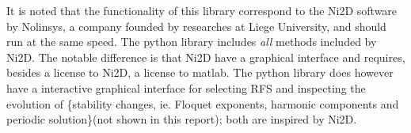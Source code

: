 It is noted that the functionality of this library correspond to the Ni2D
software by Nolinsys, a company founded by researches at Liege University, and
should run at the same speed. The python library includes \textit{all} methods
included by Ni2D. The notable difference is that Ni2D have a graphical interface
and requires, besides a license to Ni2D, a license to matlab. The python library
does however have a interactive graphical interface for selecting RFS and
inspecting the evolution of \{stability changes, ie. Floquet exponents, harmonic
components and periodic solution\}(not shown in this report); both are inspired
by Ni2D.


